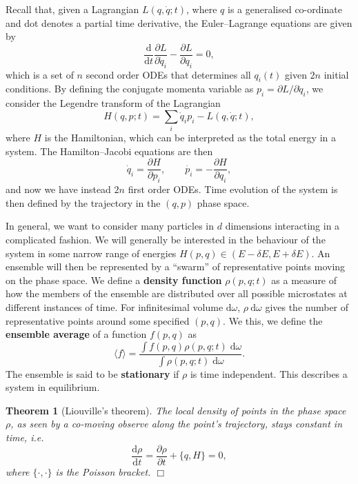 \documentclass[letter-paper]{tufte-book}
\newtheorem{theorem}{\color{pastel-blue}Theorem}[section]
\newcommand\Def[1]{\textbf{#1}}
\newcommand{\qedwhite}{\hfill \ensuremath{\Box}}
\begin{document}
Recall that, given a Lagrangian $L(q, \dot{q}; t)$, where $q$ is a generalised
co-ordinate and dot denotes a partial time derivative, the Euler--Lagrange
equations are given by
\begin{equation}
  \frac{\mathrm{d}}{\mathrm{d}t}\frac{\partial L}{\partial \dot{q}_i} - \frac{\partial L}{\partial q_i} = 0,
\end{equation}
which is a set of $n$ second order ODEs that determines all $q_i(t)$ given $2n$
initial conditions. By defining the conjugate momenta variable as $p_i =
\partial L / \partial \dot{q}_i$, we consider the Legendre transform of the
Lagrangian
\begin{equation*}
  H(q, p; t) = \sum_i \dot{q}_i p_i - L(q, \dot{q}; t),
\end{equation*}
where $H$ is the Hamiltonian, which can be interpreted as the total energy in a
system. The Hamilton--Jacobi equations are then
\begin{equation}
  \dot{q}_i = \frac{\partial H}{\partial p_i}, \qquad \dot{p_i} = -\frac{\partial H}{\partial q_i},
\end{equation}
and now we have instead $2n$ first order ODEs. Time evolution of the system is
then defined by the trajectory in the $(q,p)$ phase space.

In general, we want to consider many particles in $d$ dimensions interacting in
a complicated fashion. We will generally be interested in the behaviour of the
system in some narrow range of energies $H(p,q) \in (E-\delta E, E+\delta E)$.
An ensemble will then be represented by a ``swarm'' of representative points
moving on the phase space. We define a \Def{density function} $\rho(p,q;t)$ as
a measure of how the members of the ensemble are distributed over all possible
microstates at different instances of time. For infinitesimal volume
$\mathrm{d}\omega$, $\rho\ \mathrm{d}\omega$ gives the number of representative
points around some specified $(p,q)$. We this, we define the \Def{ensemble
average} of a function $f(p,q)$ as
\begin{equation}
  \langle f \rangle = \frac{\int f(p, q) \rho(p, q; t)\; \mathrm{d}\omega}{\int \rho(p, q; t)\; \mathrm{d}\omega}.
\end{equation}
The ensemble is said to be \Def{stationary} if $\rho$ is time independent. This
describes a system in equilibrium.

\begin{theorem}[Liouville's theorem]
The local density of points in the phase space $\rho$, as seen by a co-moving
observe along the point's trajectory, stays constant in time, i.e.
\begin{equation*}
  \frac{\mathrm{d}\rho}{\mathrm{d}t} = \frac{\partial \rho}{\partial t} + \{q, H\} = 0,
\end{equation*}
where $\{\cdot,\cdot\}$ is the Poisson bracket. \qedwhite
\end{theorem}
\end{document}
